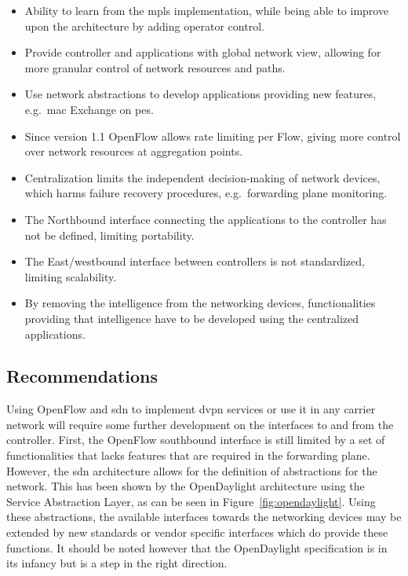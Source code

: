 \begin{minipage}[t]{0.5\textwidth}
\begin{itemize}[label=\checkmark]
	\item Ability to learn from the \ac{mpls} implementation, while being able to improve upon the architecture \cite{ss} by adding operator control.
	\item Provide controller and applications with global network view, allowing for more granular control of network resources and paths.
	\item Use network abstractions to develop applications providing new features, e.g.\ \ac{mac} Exchange on \acp{pe}.
	\item Since version 1.1 OpenFlow allows rate limiting per Flow, giving more control over network resources at aggregation points.
\end{itemize}
\end{minipage}%
\begin{minipage}[t]{0.5\textwidth}
\begin{itemize}[label=$\times$]
	\item Centralization limits the independent decision-making of network devices, which harms failure recovery procedures, e.g.\ forwarding plane monitoring.
	\item The Northbound interface connecting the applications to the controller has not be defined, limiting portability.
	\item The East/westbound interface between controllers is not standardized, limiting scalability.
	\item By removing the intelligence from the networking devices, functionalities providing that intelligence have to be developed using the centralized applications.
\end{itemize}
\end{minipage}

\vspace{5 mm}


\subsection{Recommendations} %
\label{sub:recommendations}

Using OpenFlow and \ac{sdn} to implement \ac{dvpn} services or use it in any carrier network will require some further development on the interfaces to and from the controller. First, the OpenFlow southbound interface is still limited by a set of functionalities that lacks features that are required in the forwarding plane. However, the \ac{sdn} architecture allows for the definition of abstractions for the network. This has been shown by the OpenDaylight architecture using the Service Abstraction Layer, as can be seen in Figure~\ref{fig:opendaylight}. Using these abstractions, the available interfaces towards the networking devices may be extended by new standards or vendor specific interfaces which do provide these functions. It should be noted however that the OpenDaylight specification is in its infancy but is a step in the right direction.

